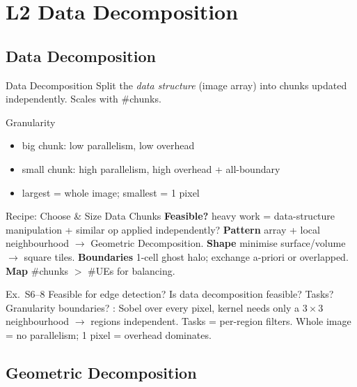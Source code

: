 \section{L2 Data Decomposition}

\subsection{Data Decomposition}


\begin{definition}{Data Decomposition}
    Split the \emph{data structure} (image array) into chunks updated independently. Scales with \#chunks.
\end{definition}

\begin{concept}{Granularity}
    \begin{itemize}
        \item big chunk: low parallelism, low overhead
        \item small chunk: high parallelism, high overhead + all-boundary
        \item largest = whole image; smallest = 1 pixel
    \end{itemize}
\end{concept}

\multend

\begin{KR}{Recipe: Choose \& Size Data Chunks}
    \textbf{Feasible?} heavy work = data-structure manipulation + similar op applied independently?
    \textbf{Pattern} array + local neighbourhood $\to$ Geometric Decomposition.
    \textbf{Shape} minimise surface/volume $\to$ square tiles.
    \textbf{Boundaries} 1-cell ghost halo; exchange a-priori or overlapped.
    \textbf{Map} \#chunks $>$ \#UEs for balancing.
\end{KR}

\begin{example2}{Ex.\ S6--8 Feasible for edge detection?}
    Is data decomposition feasible? Tasks? Granularity boundaries?
    \tcblower
    : Sobel over every pixel, kernel needs only a $3\times3$ neighbourhood $\to$ regions independent. Tasks = per-region filters. Whole image = no parallelism; 1 pixel = overhead dominates.
\end{example2}

\subsection{Geometric Decomposition}

